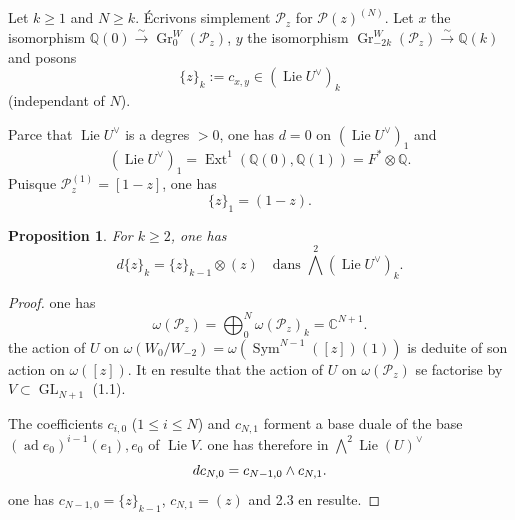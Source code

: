 \documentclass[12pt,a4paper]{article}
\theoremstyle{plain}
\newtheorem{proposition}{Proposition}[section]
\theoremstyle{definition}
\theoremstyle{remark}
\DeclareMathOperator{\Ext}{Ext}
\DeclareMathOperator{\Sym}{Sym}
\DeclareMathOperator{\Lie}{Lie}
\DeclareMathOperator{\ad}{ad}
\newcommand{\Q}{\mathbb{Q}}
\newcommand{\C}{\mathbb{C}}
\begin{document}
{Let $k\geq 1$ and $N\geq k$. {\'E}crivons simplement $\mathcal{P}_z$ for $\mathcal{P}(z)^{(N)}$. Let $x$ the isomorphism $\Q(0)\xrightarrow{\sim}\operatorname{Gr}^W_0(\mathcal{P}_z)$, $y$ the isomorphism $\operatorname{Gr}^W_{-2k}(\mathcal{P}_z)\xrightarrow{\sim}\Q(k)$ and posons
\begin{equation*}
\{z\}_k := c_{x,y}\in(\Lie U^\vee)_k
\end{equation*}
(ind{e}pendant of $N$).

Parce that $\Lie U^\vee$ is {a} degr{e}s $>0$, one has $d=0$ on $(\Lie U^\vee)_1$ and
\begin{equation*}
(\Lie U^\vee)_1 = \Ext^1(\Q(0),\Q(1)) = F^*\otimes\Q.
\end{equation*}
Puisque $\mathcal{P}_z^{(1)}=[1-z]$, one has
\begin{equation*}
\{z\}_1 = (1-z).
\end{equation*}

\begin{proposition}
For $k\geq 2$, one has
\begin{equation*}
d\{z\}_k = \{z\}_{k-1}\otimes(z) \quad \text{dans }\bigwedge^2(\Lie U^\vee)_k.
\end{equation*}
\end{proposition}

\begin{proof}
one has
\begin{equation*}
\omega(\mathcal{P}_z) = \bigoplus_0^N\omega(\mathcal{P}_z)_k = \C^{N+1}.
\end{equation*}
the action of $U$ on $\omega(W_0/W_{-2})=\omega(\Sym^{N-1}([z])(1))$ is d{e}duite of son action on $\omega([z])$. It en r{e}sulte that the action of $U$ on $\omega(\mathcal{P}_z)$ se factorise by $V\subset\operatorname{GL}_{N+1}$ (1.1).

The coefficients $c_{i,0}$ ($1\leq i\leq N$) and $c_{N,1}$ forment a base duale of the base $(\ad e_0)^{i-1}(e_1),e_0$ of $\Lie V$. one has therefore in $\bigwedge^2\Lie(U)^\vee$
\begin{equation*}
d c_{N,0} = c_{N-1,0}\wedge c_{N,1}.\qedhere
\end{equation*}
one has $c_{N-1,0}=\{z\}_{k-1}$, $c_{N,1}=(z)$ and 2.3 en r{e}sulte.
\end{proof}

\subsection{}

}
\end{document}

